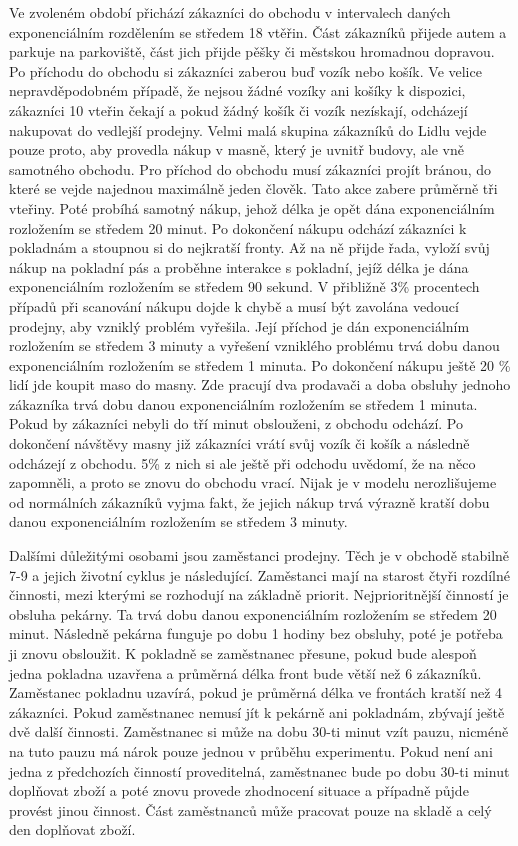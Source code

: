 \documentclass[12pt,a4paper,titlepage]{article}
\begin{document}
Ve zvoleném období přichází zákazníci do obchodu v intervalech daných exponenciálním rozdělením se středem 18 vtěřin. Část zákazníků přijede autem a parkuje na parkoviště, část jich přijde pěšky či městskou hromadnou dopravou. Po příchodu do obchodu si zákazníci zaberou buď vozík nebo košík. Ve velice nepravděpodobném případě, že nejsou žádné vozíky ani košíky k dispozici, zákazníci 10 vteřin čekají a pokud žádný košík či vozík nezískají, odcházejí nakupovat do vedlejší prodejny. Velmi malá skupina zákazníků do Lidlu vejde pouze proto, aby provedla nákup v masně, který je uvnitř budovy, ale vně samotného obchodu. Pro příchod do obchodu musí zákazníci projít bránou, do které se vejde najednou maximálně jeden člověk. Tato akce zabere průměrně tři vteřiny. Poté probíhá samotný nákup, jehož délka je opět dána exponenciálním rozložením se středem 20 minut. Po dokončení nákupu odchází zákazníci k pokladnám a stoupnou si do nejkratší fronty. Až na ně přijde řada, vyloží svůj nákup na pokladní pás a proběhne interakce s pokladní, jejíž délka je dána exponenciálním rozložením se středem 90 sekund. V přibližně 3\% procentech případů při scanování nákupu dojde k chybě a musí být zavolána vedoucí prodejny, aby vzniklý problém vyřešila. Její příchod je dán exponenciálním rozložením se středem 3 minuty a vyřešení vzniklého problému trvá dobu danou exponenciálním rozložením se středem 1 minuta. Po dokončení nákupu ještě 20 \% lidí jde koupit maso do masny. Zde pracují dva prodavači a doba obsluhy jednoho zákazníka trvá dobu danou exponenciálním rozložením se středem 1 minuta. Pokud by zákazníci nebyli do tří minut obslouženi, z obchodu odchází. Po dokončení návštěvy masny již zákazníci vrátí svůj vozík či košík a následně odcházejí z obchodu. 5\% z nich si ale ještě při odchodu uvědomí, že na něco zapomněli, a proto se znovu do  obchodu vrací. Nijak je v modelu nerozlišujeme od normálních zákazníků vyjma fakt, že jejich nákup trvá výrazně kratší dobu danou exponenciálním rozložením se středem 3 minuty.

Dalšími důležitými osobami jsou zaměstanci prodejny. Těch je v obchodě stabilně 7-9 a jejich životní cyklus je následující. Zaměstanci mají na starost čtyři rozdílné činnosti, mezi kterými se rozhodují na základně priorit. Nejprioritnější činností je obsluha pekárny. Ta trvá dobu danou exponenciálním rozložením se středem 20 minut. Následně pekárna funguje po dobu 1 hodiny bez obsluhy, poté je potřeba ji znovu obsloužit. K pokladně se zaměstnanec přesune, pokud bude alespoň jedna pokladna uzavřena a průměrná délka front bude větší než 6 zákazníků. Zaměstanec pokladnu uzavírá, pokud je průměrná délka ve frontách kratší než 4 zákazníci. Pokud zaměstnanec nemusí jít k pekárně ani pokladnám, zbývají ještě dvě další činnosti. Zaměstnanec si může na dobu 30-ti minut vzít pauzu, nicméně na tuto pauzu má nárok pouze jednou v průběhu experimentu. Pokud není ani jedna z předchozích činností proveditelná, zaměstnanec bude po dobu 30-ti minut doplňovat zboží a poté znovu provede zhodnocení situace a případně půjde provést jinou činnost. Část zaměstnanců může pracovat pouze na skladě a celý den doplňovat zboží.
\end{document}

